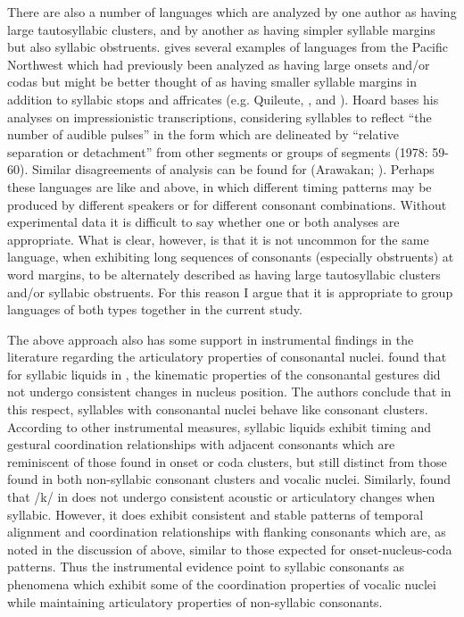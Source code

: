   There are also a number of languages which are analyzed by one author as having large tautosyllabic clusters, and by another as having simpler syllable margins but also syllabic obstruents. \citet{Hoard1978} gives several examples of languages from the Pacific Northwest which had previously been analyzed as having large onsets and/or codas but might be better thought of as having smaller syllable margins in addition to syllabic stops and affricates (e.g. Quileute, , and ). Hoard bases his analyses on impressionistic transcriptions, considering syllables to reflect “the number of audible pulses” in the form which are delineated by “relative separation or detachment” from other segments or groups of segments (1978: 59-60). Similar disagreements of analysis can be found for  (Arawakan; \citealt{Matteson1965,Lin1997,Hanson2010}). Perhaps these languages are like  and  above, in which different timing patterns may be produced by different speakers or for different consonant combinations. Without experimental data it is difficult to say whether one or both analyses are appropriate. What is clear, however, is that it is not uncommon for the same language, when exhibiting long sequences of consonants (especially obstruents) at word margins, to be alternately described as having large tautosyllabic clusters and/or syllabic obstruents. For this reason I argue that it is appropriate to group languages of both types together in the current study.

  The above approach also has some support in instrumental findings in the literature regarding the articulatory properties of consonantal nuclei. \citet{PouplierBeňuš2011} found that for syllabic liquids in , the kinematic properties of the consonantal gestures did not undergo consistent changes in nucleus position. The authors conclude that in this respect, syllables with consonantal nuclei behave like consonant clusters. According to other instrumental measures, syllabic liquids exhibit timing and gestural coordination relationships with adjacent consonants which are reminiscent of those found in onset or coda clusters, but still distinct from those found in both non-syllabic consonant clusters and vocalic nuclei. Similarly, \citet{FougeronRidouane2008} found that /k/ in  does not undergo consistent acoustic or articulatory changes when syllabic. However, it does exhibit consistent and stable patterns of temporal alignment and coordination relationships with flanking consonants which are, as noted in the discussion of \citet{GoldsteinEtAl2007} above, similar to those expected for onset-nucleus-coda patterns. Thus the instrumental evidence point to syllabic consonants as phenomena which exhibit some of the coordination properties of vocalic nuclei while maintaining articulatory properties of non-syllabic consonants.

